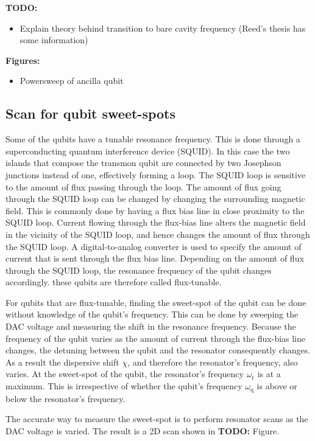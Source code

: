 \documentclass[12pt]{report}
\newcommand{\wres}{\omega_\text{r}}
\newcommand{\wqub}{\omega_\text{q}}
\begin{document}
        \textbf{TODO:}
        \begin{itemize}
          \item Explain theory behind transition to bare cavity frequency (Reed's thesis has some information)
        \end{itemize}

        \textbf{Figures:}
        \begin{itemize}
          \item Powersweep of ancilla qubit
        \end{itemize}

      \subsection{Scan for qubit sweet-spots}
        Some of the qubits have a tunable resonance frequency. This is done through a superconducting quantum interference device (SQUID). In this case the two islands that compose the transmon qubit are connected by two Josephson junctions instead of one, effectively forming a loop. The SQUID loop is sensitive to the amount of flux passing through the loop. The amount of flux going through the SQUID loop can be changed by changing the surrounding magnetic field. This is commonly done by having a flux bias line in close proximity to the SQUID loop. Current flowing through the flux-bias line alters the magnetic field in the vicinity of the SQUID loop, and hence changes the amount of flux through the SQUID loop. A digital-to-analog converter is used to specify the amount of current that is sent through the flux bias line. Depending on the amount of flux through the SQUID loop, the resonance frequency of the qubit changes accordingly. these qubits are therefore called flux-tunable.

        For qubits that are flux-tunable, finding the sweet-spot of the qubit can be done without knowledge of the qubit's frequency. This can be done by sweeping the DAC voltage and measuring the shift in the resonance frequency. Because the frequency of the qubit varies as the amount of current through the flux-bias line changes, the detuning between the qubit and the resonator consequently changes. As a result the dispersive shift $\chi$, and therefore the resonator's frequency, also varies. At the sweet-spot of the qubit, the resonator's frequency $\wres$ is at a maximum. This is irrespective of whether the qubit's frequency $\wqub$ is above or below the resonator's frequency.

        The accurate way to measure the sweet-spot is to perform resonator scans as the DAC voltage is varied. The result is a 2D scan shown in \textbf{TODO:} Figure.
\end{document}
